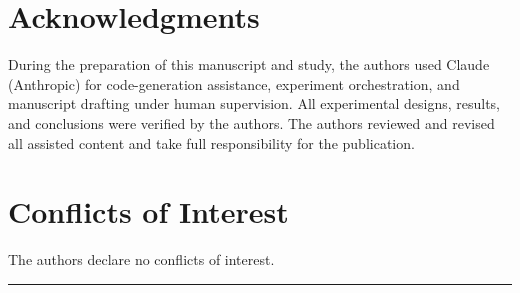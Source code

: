\documentclass[energies,article,submit,moreauthors]{Definitions/mdpi}
\begin{document}
\section*{Acknowledgments}

During the preparation of this manuscript and study, the authors used Claude (Anthropic) for code-generation assistance, experiment orchestration, and manuscript drafting under human supervision. All experimental designs, results, and conclusions were verified by the authors. The authors reviewed and revised all assisted content and take full responsibility for the publication.

\section*{Conflicts of Interest}

The authors declare no conflicts of interest.

\begin{center}\rule{0.5\linewidth}{0.5pt}\end{center}
\end{document}
